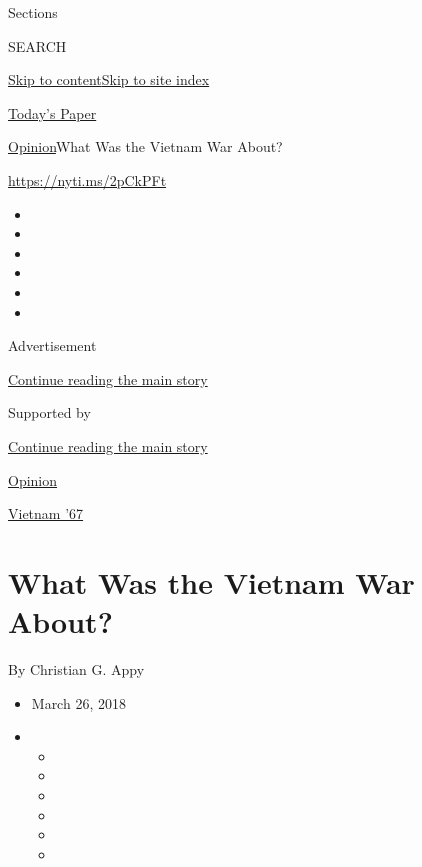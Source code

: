 Sections

SEARCH

\protect\hyperlink{site-content}{Skip to
content}\protect\hyperlink{site-index}{Skip to site index}

\href{https://myaccount.nytimes.com/auth/login?response_type=cookie\&client_id=vi}{}

\href{https://www.nytimes.com/section/todayspaper}{Today's Paper}

\href{/section/opinion}{Opinion}\textbar{}What Was the Vietnam War
About?

\href{https://nyti.ms/2pCkPFt}{https://nyti.ms/2pCkPFt}

\begin{itemize}
\item
\item
\item
\item
\item
\item
\end{itemize}

Advertisement

\protect\hyperlink{after-top}{Continue reading the main story}

Supported by

\protect\hyperlink{after-sponsor}{Continue reading the main story}

\href{/section/opinion}{Opinion}

\href{/column/vietnam-67}{Vietnam '67}

\hypertarget{what-was-the-vietnam-war-about}{%
\section{What Was the Vietnam War
About?}\label{what-was-the-vietnam-war-about}}

By Christian G. Appy

\begin{itemize}
\item
  March 26, 2018
\item
  \begin{itemize}
  \item
  \item
  \item
  \item
  \item
  \item
  \end{itemize}
\end{itemize}

